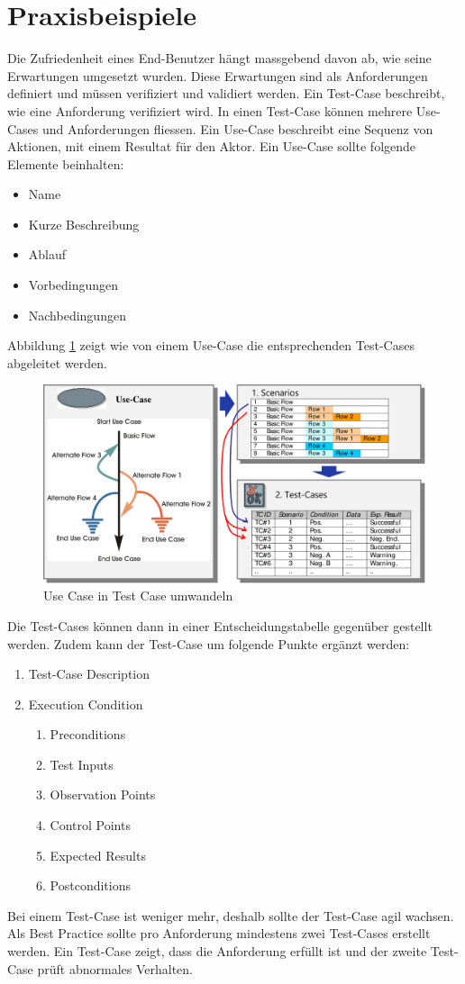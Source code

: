 \section{Praxisbeispiele}

Die Zufriedenheit eines End-Benutzer hängt massgebend davon ab, wie seine Erwartungen umgesetzt wurden. Diese Erwartungen sind als Anforderungen definiert und müssen verifiziert und validiert werden. Ein Test-Case beschreibt, wie eine Anforderung verifiziert wird. In einen Test-Case können mehrere Use-Cases und Anforderungen fliessen. Ein Use-Case beschreibt eine Sequenz von Aktionen, mit einem Resultat für den Aktor. Ein Use-Case sollte folgende Elemente beinhalten:
\begin{itemize}
	\item Name
	\item Kurze Beschreibung
	\item Ablauf
	\item Vorbedingungen
	\item Nachbedingungen
\end{itemize}
Abbildung \ref{fig:use-case-to-test-case} zeigt wie von einem Use-Case die entsprechenden Test-Cases abgeleitet werden.
\begin{figure}
\centering
\includegraphics[width=0.7\linewidth]{fig/use-case-to-test-case}
\caption{Use Case in Test Case umwandeln}
\label{fig:use-case-to-test-case}
\end{figure}
Die Test-Cases können dann in einer Entscheidungstabelle gegenüber gestellt werden. Zudem kann der Test-Case um folgende Punkte ergänzt werden:
\begin{enumerate}
	\item Test-Case Description
	\item Execution Condition
		\begin{enumerate}
			\item Preconditions
			\item Test Inputs
			\item Observation Points
			\item Control Points
			\item Expected Results
			\item Postconditions
		\end{enumerate}
\end{enumerate}
Bei einem Test-Case ist weniger mehr, deshalb sollte der Test-Case agil wachsen. Als Best Practice sollte pro Anforderung mindestens zwei Test-Cases erstellt werden. Ein Test-Case zeigt, dass die Anforderung erfüllt ist und der zweite Test-Case prüft abnormales Verhalten. 

